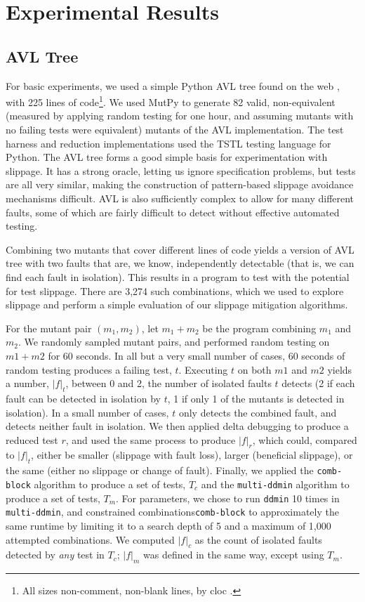 \section {Experimental Results}

\subsection{AVL Tree}

For basic experiments, we used a simple Python AVL tree found on the
web \cite{avltree}, with 225 lines of code\footnote{All sizes
  non-comment, non-blank lines, by cloc \cite{cloc}.}.  We used MutPy
to generate 82 valid, non-equivalent (measured by applying random
testing for one hour, and assuming mutants with no failing tests were
equivalent) mutants of the AVL implementation.  The test harness and
reduction implementations used the TSTL \cite{tstl,ISSTA15,NFM15}
testing language for Python.  The AVL tree forms a good simple basis
for experimentation with slippage.  It has a strong oracle, letting us
ignore specification problems, but tests are all very similar, making
the construction of pattern-based slippage avoidance mechanisms
difficult.  AVL is also sufficiently complex to allow for many different
faults, some of which are fairly difficult to detect without effective
automated testing.

Combining two mutants that cover different lines of code yields a version
of AVL tree with two faults that are, we know, independently
detectable (that is, we can find each fault in isolation).  This
results in a program to test with the potential for test slippage.
There are 3,274 such combinations, which we used to explore slippage
and perform a simple evaluation of our slippage mitigation algorithms.

For the mutant pair $(m_1,m_2)$, let $m_1+m_2$ be the program
combining $m_1$ and $m_2$.  We randomly sampled mutant pairs, and
performed random testing on $m1+m2$ for 60 seconds. In all but a very
small number of cases, 60 seconds of random testing produces a failing
test, $t$.  Executing $t$ on both $m1$ and $m2$ yields a number,
$|f|_t$, between 0 and 2, the number of isolated faults $t$ detects (2
if each fault can be detected in isolation by $t$, 1 if only 1 of the
mutants is detected in isolation).  In a small number of cases, $t$
only detects the combined fault, and detects neither fault in
isolation.  We then applied delta debugging to produce a reduced test
$r$, and used the same process to produce $|f|_r$, which could,
compared to $|f|_t$, either be smaller (slippage with fault loss),
larger (beneficial slippage), or the same (either no slippage or
change of fault).  Finally, we applied the {\tt comb-block} algorithm
to produce a set of tests, $T_c$ and the {\tt multi-ddmin} algorithm
to produce a set of tests, $T_m$.  For parameters, we chose to run
{\tt ddmin} 10 times in {\tt multi-ddmin}, and constrained
combinations{\tt comb-block} to approximately the same runtime by
limiting it to a search depth of 5 and a maximum of 1,000 attempted
combinations.  We computed $|f|_c$ as the count of isolated faults
detected by \emph{any} test in $T_c$; $|f|_m$ was defined in the same
way, except using $T_m$.


